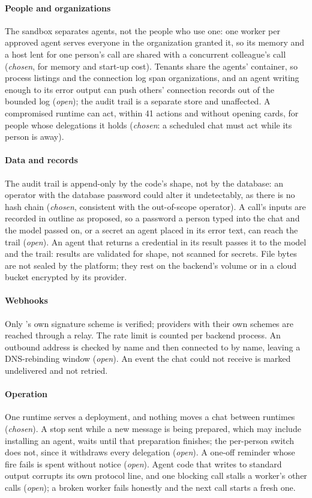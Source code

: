 \paragraph{People and organizations}
The sandbox separates agents, not the people who use one: one worker
per approved agent serves everyone in the organization granted it, so
its memory and a host lent for one person's call are shared with a
concurrent colleague's call (\emph{chosen}, for memory and start-up
cost). Tenants share the agents' container, so process listings and the
connection log span organizations, and an agent writing enough to its
error output can push others' connection records out of the bounded
log (\emph{open}); the audit trail is a separate store and unaffected.
A compromised runtime can act, within 41 actions and without opening
cards, for people whose delegations it holds (\emph{chosen}: a
scheduled chat must act while its person is away).

\paragraph{Data and records}
The audit trail is append-only by the code's shape, not by the
database: an operator with the database password could alter it
undetectably, as there is no hash chain (\emph{chosen}, consistent with
the out-of-scope operator). A call's inputs are recorded in outline as
proposed, so a password a person typed into the chat and the model
passed on, or a secret an agent placed in its error text, can reach the
trail (\emph{open}). An agent that returns a credential in its result
passes it to the model and the trail: results are validated for shape,
not scanned for secrets. File bytes are not sealed by the platform; they
rest on the backend's volume or in a cloud bucket encrypted by its
provider.

\paragraph{Webhooks}
Only \sys{}'s own signature scheme is verified; providers with their
own schemes are reached through a relay. The rate limit is counted per
backend process. An outbound address is checked by name and then
connected to by name, leaving a DNS-rebinding window (\emph{open}). An
event the chat could not receive is marked undelivered and not retried.

\paragraph{Operation}
One runtime serves a deployment, and nothing moves a chat between
runtimes (\emph{chosen}). A stop sent while a new message is being
prepared, which may include installing an agent, waits until that
preparation finishes; the per-person switch does not, since it
withdraws every delegation (\emph{open}). A one-off reminder whose fire
fails is spent without notice (\emph{open}). Agent code that writes to
standard output corrupts its own protocol line, and one blocking call
stalls a worker's other calls (\emph{open}); a broken worker fails
honestly and the next call starts a fresh one.
